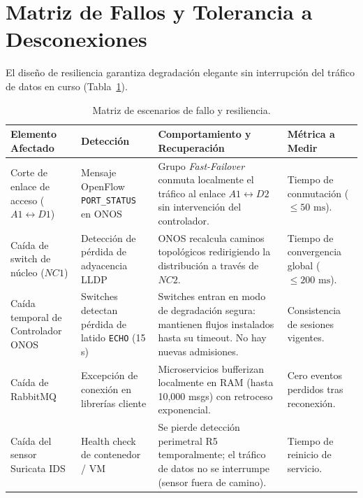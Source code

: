 \documentclass[11pt,a4paper]{report}
\begin{document}
\section{Matriz de Fallos y Tolerancia a Desconexiones}
El diseño de resiliencia garantiza degradación elegante sin interrupción del tráfico de datos en curso (Tabla~\ref{tab:fallos}).

\begin{table}[h!]
\centering
\small
\begin{tabularx}{\linewidth}{p{2.8cm}p{3.2cm}Xp{2.5cm}}
\toprule
\textbf{Elemento Afectado} & \textbf{Detección} & \textbf{Comportamiento y Recuperación} & \textbf{Métrica a Medir} \\
\midrule
Corte de enlace de acceso ($A1 \leftrightarrow D1$) & Mensaje OpenFlow \texttt{PORT\_STATUS} en ONOS & Grupo \emph{Fast-Failover} conmuta localmente el tráfico al enlace $A1 \leftrightarrow D2$ sin intervención del controlador. & Tiempo de conmutación ($\le 50\text{ ms}$). \\
Caída de switch de núcleo ($NC1$) & Detección de pérdida de adyacencia LLDP & ONOS recalcula caminos topológicos redirigiendo la distribución a través de $NC2$. & Tiempo de convergencia global ($\le 200\text{ ms}$). \\
Caída temporal de Controlador ONOS & Switches detectan pérdida de latido \texttt{ECHO} (15 s) & Switches entran en modo de degradación segura: mantienen flujos instalados hasta su timeout. No hay nuevas admisiones. & Consistencia de sesiones vigentes. \\
Caída de RabbitMQ & Excepción de conexión en librerías cliente & Microservicios bufferizan localmente en RAM (hasta 10,000 msgs) con retroceso exponencial. & Cero eventos perdidos tras reconexión. \\
Caída del sensor Suricata IDS & Health check de contenedor / VM & Se pierde detección perimetral R5 temporalmente; el tráfico de datos no se interrumpe (sensor fuera de camino). & Tiempo de reinicio de servicio. \\
\bottomrule
\end{tabularx}
\caption{Matriz de escenarios de fallo y resiliencia.}
\label{tab:fallos}
\end{table}
\end{document}
